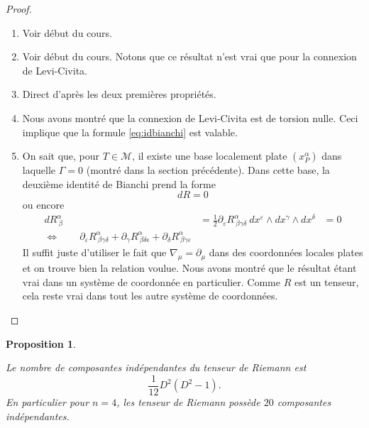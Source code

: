 \documentclass[a4paper,11pt]{report}
\theoremstyle{definition}
\theoremstyle{plain}
\newtheorem{prop}[thm]{Proposition}
\theoremstyle{definition}
\theoremstyle{remark}
\newcommand{\M}{\mathscr{M}}
\newcommand{\p}{\partial}
\begin{document}
                \begin{proof}${}$\\
                    \begin{enumerate}[label = \textit{\roman*)}]
                        \item Voir début du cours.
                        \item Voir début du cours. Notons que ce résultat n'est vrai que pour la connexion de Levi-Civita.
                        \item Direct d'après les deux premières propriétés.
                        \item Nous avons montré que la connexion de Levi-Civita est de torsion nulle. Ceci implique que la formule \ref{eq:idbianchi} est valable.
                        \item On sait que, pour $T\in\M$, il existe une base localement plate $(x^\alpha_P)$ dans laquelle $\Gamma = 0$ (montré dans la section précédente). Dans cette base, la deuxième identité de Bianchi prend la forme
                        \begin{equation}
                            dR = 0
                        \end{equation}
                        ou encore
                        \begin{align}
                            dR^\alpha_{~\beta} &= \frac{1}{2} \p_\varepsilon R^\alpha_{~\beta\gamma\delta}~dx^\varepsilon\wedge dx^\gamma\wedge dx^\delta &= 0\\
                            \Leftrightarrow\qquad \p_\varepsilon R^\alpha_{~\beta\gamma\delta} + \p_\gamma R^\alpha_{~\beta\delta\epsilon} + \p_\delta R^\alpha_{~\beta\gamma\varepsilon}
                        \end{align}
                        Il suffit juste d'utiliser le fait que $\nabla_\mu = \p_\mu$ dans des coordonnées locales plates et on trouve bien la relation voulue. Nous avons montré que le résultat étant vrai dans un système de coordonnée en particulier. Comme $R$ est un tenseur, cela reste vrai dans tout les autre système de coordonnées.
                    \end{enumerate}
                \end{proof}
                
                \begin{prop}\begin{leftbar}
                    Le nombre de composantes indépendantes du tenseur de Riemann est
                    \begin{equation}
                        \frac{1}{12}D^2(D^2-1).
                    \end{equation}
                    En particulier pour $n=4$, les tenseur de Riemann possède $20$ composantes indépendantes.
                \end{leftbar}\end{prop}
                
\end{document}
